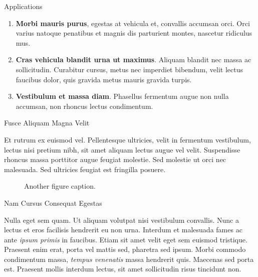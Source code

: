 \documentclass[final]{beamer}
\newlength{\colwidth}
\begin{document}
\begin{frame}[t]
\begin{columns}[t]
\begin{column}{\colwidth}
\begin{block}{Applications}
    \begin{enumerate}
      \item \textbf{Morbi mauris purus}, egestas at vehicula et, convallis
        accumsan orci. Orci varius natoque penatibus et magnis dis parturient
        montes, nascetur ridiculus mus.
      \item \textbf{Cras vehicula blandit urna ut maximus}. Aliquam blandit nec
        massa ac sollicitudin. Curabitur cursus, metus nec imperdiet bibendum,
        velit lectus faucibus dolor, quis gravida metus mauris gravida turpis.
      \item \textbf{Vestibulum et massa diam}. Phasellus fermentum augue non
        nulla accumsan, non rhoncus lectus condimentum.
    \end{enumerate}

  \end{block}

  \begin{block}{Fusce Aliquam Magna Velit}

    Et rutrum ex euismod vel. Pellentesque ultricies, velit in fermentum
    vestibulum, lectus nisi pretium nibh, sit amet aliquam lectus augue vel
    velit. Suspendisse rhoncus massa porttitor augue feugiat molestie. Sed
    molestie ut orci nec malesuada. Sed ultricies feugiat est fringilla
    posuere.

    \begin{figure}
      \centering
      \caption{Another figure caption.}
    \end{figure}

  \end{block}

  \begin{block}{Nam Cursus Consequat Egestas}

    Nulla eget sem quam. Ut aliquam volutpat nisi vestibulum convallis. Nunc a
    lectus et eros facilisis hendrerit eu non urna. Interdum et malesuada fames
    ac ante \textit{ipsum primis} in faucibus. Etiam sit amet velit eget sem
    euismod tristique. Praesent enim erat, porta vel mattis sed, pharetra sed
    ipsum. Morbi commodo condimentum massa, \textit{tempus venenatis} massa
    hendrerit quis. Maecenas sed porta est. Praesent mollis interdum lectus,
    sit amet sollicitudin risus tincidunt non.


\end{block}
\end{column}
\end{columns}
\end{frame}
\end{document}
